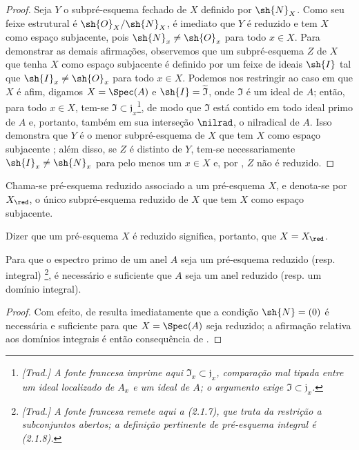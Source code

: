 \documentclass[oneside]{amsart}
\let\EGAOriginalLabel\label
\renewcommand{\label}[1]{\phantomsection\EGAOriginalLabel{#1}}
\begin{document}
\begin{proof}
Seja $Y$ o subpré-esquema fechado de $X$ definido por $\sh{N}_X$.
Como seu feixe estrutural é $\sh{O}_X/\sh{N}_X$, é imediato que $Y$ é reduzido e tem $X$ como espaço subjacente, pois $\sh{N}_x\neq\sh{O}_x$ para todo $x\in X$.
Para demonstrar as demais afirmações, observemos que um subpré-esquema $Z$ de $X$ que tenha $X$ como espaço subjacente é definido por um feixe de ideais $\sh{I}$  tal que $\sh{I}_x\neq\sh{O}_x$ para todo $x\in X$.
Podemos nos restringir ao caso em que $X$ é afim, digamos $X=\Spec(A)$ e $\sh{I}=\widetilde{\mathfrak{I}}$, onde $\mathfrak{I}$ é um ideal de $A$;
então, para todo $x\in X$, tem-se $\mathfrak{I}\subset\mathfrak{j}_x$\footnote{\emph{[Trad.] A fonte francesa imprime aqui $\mathfrak{I}_x\subset\mathfrak{j}_x$, comparação mal tipada entre um ideal localizado de $A_x$ e um ideal de $A$; o argumento exige $\mathfrak{I}\subset\mathfrak{j}_x$.}}, de modo que $\mathfrak{I}$ está contido em todo ideal primo de $A$ e, portanto, também em sua interseção $\nilrad$, o nilradical de $A$.
Isso demonstra que $Y$ é o menor subpré-esquema de $X$ que tem $X$ como espaço subjacente ;
além disso, se $Z$ é distinto de $Y$, tem-se necessariamente $\sh{I}_x\neq\sh{N}_x$ para pelo menos um $x\in X$ e, por , $Z$ não é reduzido.
\end{proof}

\begin{definition}[5.1.3]
\label{I.5.1.3}
Chama-se pré-esquema reduzido associado a um pré-esquema $X$, e denota-se por $X_\red$, o único subpré-esquema reduzido de $X$ que tem $X$ como espaço subjacente.
\end{definition}

Dizer que um pré-esquema $X$ é reduzido significa, portanto, que $X=X_\red$.

\begin{proposition}[5.1.4]
\label{I.5.1.4}
Para que o espectro primo de um anel $A$ seja um pré-esquema reduzido (resp. integral) \footnote{\emph{[Trad.] A fonte francesa remete aqui a (2.1.7), que trata da restrição a subconjuntos abertos; a definição pertinente de pré-esquema integral é (2.1.8).}}, é necessário e suficiente que $A$ seja um anel reduzido (resp. um domínio integral).
\end{proposition}

\begin{proof}
Com efeito, de  resulta imediatamente que a condição $\sh{N}=(0)$ é necessária e suficiente para que $X=\Spec(A)$ seja reduzido;
a afirmação relativa aos domínios integrais é então consequência de .
\end{proof}
\end{document}
